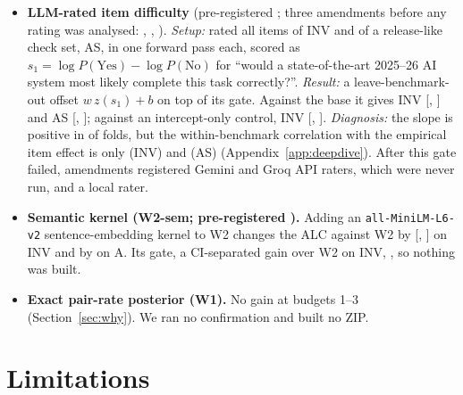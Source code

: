 \documentclass{article}
\begin{document}
\begin{itemize}
\item \textbf{LLM-rated item difficulty} (pre-registered \ItPreregTime; three amendments before any rating was analysed: \ItAmOneTime, \ItAmTwoTime, \ItAmThreeTime).
\emph{Setup:} \ItModel{} rated all \ItNItems{} items of INV and of a release-like check set, AS, in one forward pass each, scored as $s_1=\log P(\text{Yes})-\log P(\text{No})$ for ``would a state-of-the-art 2025--26 AI system most likely complete this task correctly?''. \emph{Result:} a leave-benchmark-out offset $w\,z(s_1)+b$ on top of \SelId{} \ItGateBase{} its gate. Against the base it gives INV \ItInvSOneMean{} [\ItInvSOneLo, \ItInvSOneHi] and AS \ItAsSOneMean{} [\ItAsSOneLo, \ItAsSOneHi]; against an intercept-only control, INV \ItInvCtrlMean{} [\ItInvCtrlLo, \ItInvCtrlHi]. \emph{Diagnosis:} the slope is positive in \ItNFoldsWPos{} of \ItNFolds{} folds, but the within-benchmark correlation with the empirical item effect is only \ItCorrInvMedian{} (INV) and \ItCorrAsMedian{} (AS) (Appendix~\ref{app:deepdive}). After this gate failed, amendments registered Gemini and Groq API raters, which were never run, and a local rater. \QwenFourteenSentence{}
\item \textbf{Semantic kernel (W2-sem; pre-registered \WsTime).} Adding an \texttt{all-MiniLM-L6-v2} sentence-embedding kernel to W2 changes the ALC against W2 by \WsInvVsWtwoMean{} [\WsInvVsWtwoLo, \WsInvVsWtwoHi] on INV and by \WsAVsWtwoMean{} on A. Its gate, a CI-separated gain over W2 on INV, \WsGateD, so nothing was built.
\item \textbf{Exact pair-rate posterior (W1).} No gain at budgets 1--3 (Section~\ref{sec:why}). We ran no confirmation and built no ZIP.
\end{itemize}

\section{Limitations}
\label{sec:limitations}
\end{document}
